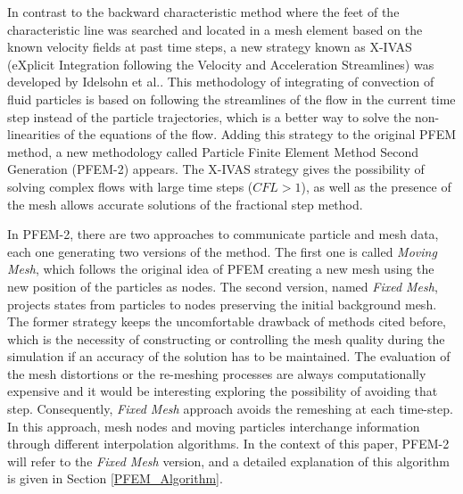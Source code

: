 In contrast to the backward characteristic method where the feet of the characteristic line was searched and located in a mesh element based on the known velocity fields at past time steps, a new strategy known as X-IVAS (eXplicit Integration following the Velocity and Acceleration Streamlines) was developed by Idelsohn et al.\cite{Idelsohn12}. This methodology of integrating of convection of fluid particles is based on following the streamlines of the flow in the current time step instead of the particle trajectories, which is a better way to solve the non-linearities of the equations of the flow. Adding this strategy to the original PFEM method, a new methodology called Particle Finite Element Method Second Generation (PFEM-2)\cite{Idelsohn12b} appears. The X-IVAS strategy gives the possibility of solving complex flows with large time steps ($CFL>1$), as well as the presence of the mesh allows accurate solutions of the fractional step method.

In PFEM-2, there are two approaches to communicate particle and mesh data, each one generating two versions of the method. The first one is called \textit{Moving Mesh}, which follows the original idea of PFEM creating a new mesh using the new position of the particles as nodes. The second version, named \textit{Fixed Mesh}, projects states from particles to nodes preserving the initial background mesh. The former strategy keeps the uncomfortable drawback of methods cited before, which is the necessity of constructing or controlling the mesh quality during the simulation if an accuracy of the solution has to be maintained. The evaluation of the mesh distortions or the re-meshing processes are always computationally expensive and it would be interesting exploring the possibility of avoiding that step. Consequently, \textit{Fixed Mesh} approach avoids the remeshing at each time-step. In this approach, mesh nodes and moving particles interchange information through different interpolation algorithms. In the context of this paper, PFEM-2 will refer to the \textit{Fixed Mesh} version, and a detailed explanation of this algorithm is given in Section \ref{PFEM_Algorithm}.

